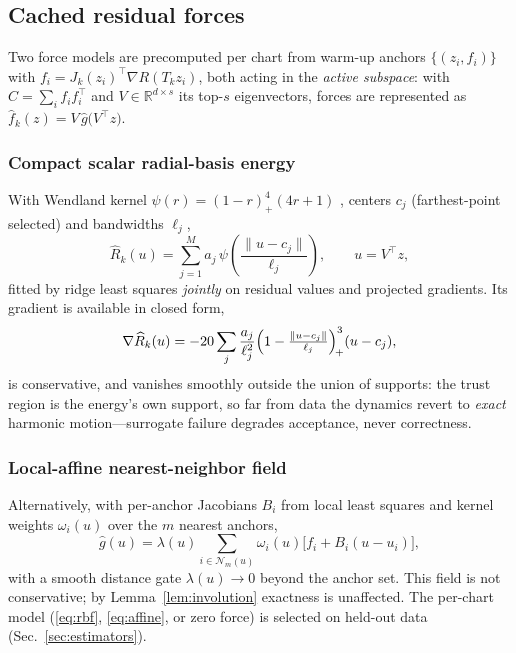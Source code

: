 \documentclass[10pt,journal,compsoc]{IEEEtran}
\newcommand{\R}{\mathbb{R}}
\begin{document}
\subsection{Cached residual forces}\label{sec:surrogate}
Two force models are precomputed per chart from warm-up anchors
$\{(z_i,f_i)\}$ with $f_i=J_k(z_i)^\top\nabla R(T_kz_i)$, both acting in
the \emph{active subspace}: with
$C=\sum_i f_if_i^\top$ and $V\in\R^{d\times s}$ its top-$s$ eigenvectors,
forces are represented as $\hat f_k(z)=V\,\hat g\bigl(V^\top z\bigr)$.

\subsubsection{Compact scalar radial-basis energy}
With Wendland kernel $\psi(r)=(1-r)_+^4(4r+1)$ \cite{wendland1995},
centers $c_j$ (farthest-point selected) and bandwidths $\ell_j$,
\begin{equation}
\widehat R_k(u)=\sum_{j=1}^{M}a_j\,
\psi\!\left(\frac{\lVert u-c_j\rVert}{\ell_j}\right),
\qquad u=V^\top z,
\label{eq:rbf}
\end{equation}
fitted by ridge least squares \emph{jointly} on residual values and
projected gradients. Its gradient is available in closed form,
\begin{equation}
\nabla\widehat R_k(u)
=-20\sum_{j}\frac{a_j}{\ell_j^{2}}
\Bigl(1-\tfrac{\lVert u-c_j\rVert}{\ell_j}\Bigr)_{\!+}^{3}(u-c_j),
\label{eq:rbfgrad}
\end{equation}
is conservative, and vanishes smoothly outside the union of supports: the
trust region is the energy's own support, so far from data the dynamics
revert to \emph{exact} harmonic motion---surrogate failure degrades
acceptance, never correctness.

\subsubsection{Local-affine nearest-neighbor field}
Alternatively, with per-anchor Jacobians $B_i$ from local least squares and
kernel weights $\omega_i(u)$ over the $m$ nearest anchors,
\begin{equation}
\hat g(u)=\lambda(u)\sum_{i\in\mathcal N_m(u)}
\omega_i(u)\bigl[f_i+B_i(u-u_i)\bigr],
\label{eq:affine}
\end{equation}
with a smooth distance gate $\lambda(u)\to0$ beyond the anchor set. This
field is not conservative; by Lemma~\ref{lem:involution} exactness is
unaffected. The per-chart model (\eqref{eq:rbf}, \eqref{eq:affine}, or zero
force) is selected on held-out data (Sec.~\ref{sec:estimators}).
\end{document}

